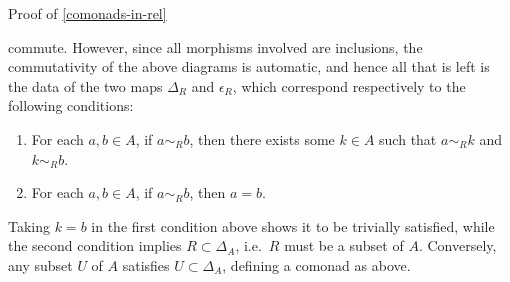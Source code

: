 \begin{Proof}{Proof of \cref{comonads-in-rel}}
\begin{webcompile}
    \end{webcompile}%
    \endgroup%
    commute. However, since all morphisms involved are inclusions, the commutativity of the above diagrams is automatic, and hence all that is left is the data of the two maps $\Delta_{R}$ and $\epsilon_{R}$, which correspond respectively to the following conditions:
    \begin{enumerate}%
        \item For each $a,b\in A$, if $a\sim_{R}b$, then there exists some $k\in A$ such that $a\sim_{R}k$ and $k\sim_{R}b$.
        \item For each $a,b\in A$, if $a\sim_{R}b$, then $a=b$.
    \end{enumerate}%
    Taking $k=b$ in the first condition above shows it to be trivially satisfied, while the second condition implies $R\subset\Delta_{A}$, i.e.\ $R$ must be a subset of $A$. Conversely, any subset $U$ of $A$ satisfies $U\subset\Delta_{A}$, defining a comonad as above.
\end{Proof}
